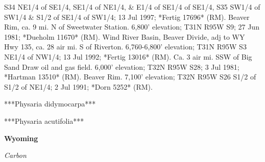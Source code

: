 S34 NE1/4 of SE1/4, SE1/4 of NE1/4, \& E1/4 of SE1/4 of SE1/4, S35 SW1/4 of SW1/4 \& S1/2 of SE1/4 of SW1/4; 13 Jul 1997; *Fertig 17696* (RM).  Beaver Rim, ca. 9 mi. N of Sweetwater Station. 6,800' elevation; T31N R95W S9; 27 Jun 1981; *Dueholm 11670* (RM).  Wind River Basin, Beaver Divide, adj to WY Hwy 135, ca. 28 air mi. S of Riverton. 6,760-6,800' elevation; T31N R95W S3 NE1/4 of NW1/4; 13 Jul 1992; *Fertig 13016* (RM).  Ca. 3 air mi. SSW of Big Sand Draw oil and gas field. 6,000' elevation; T32N R95W S28; 3 Jul 1981; *Hartman 13510* (RM).  Beaver Rim. 7,100' elevation; T32N R95W S26 S1/2 of S1/2 of NE1/4; 2 Jul 1991; *Dorn 5252* (RM).

***Physaria didymocarpa***



***Physaria acutifolia***

\textbf{Wyoming} %

\textit{Carbon}




